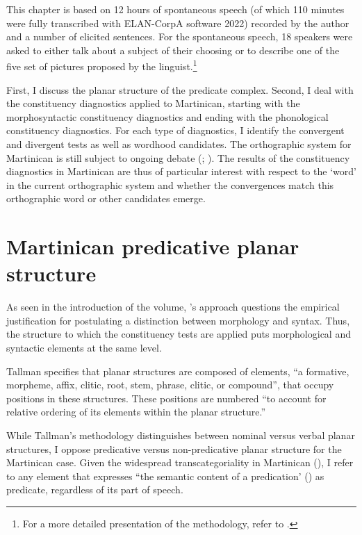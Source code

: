 \documentclass[output=paper]{langscibook}
\begin{document}
This chapter is based on 12 hours of spontaneous speech (of which 110 minutes were fully transcribed with ELAN-CorpA software 2022) recorded by the author and a number of elicited sentences. For the spontaneous speech, 18 speakers were asked to either talk about a subject of their choosing or to describe one of the five set of pictures proposed by the linguist.\footnote{For a more detailed presentation of the methodology, refer to \citealt[17--22]{Duzerol2021}.}

First, I discuss the planar structure of the predicate complex. Second, I deal with the constituency diagnostics applied to Martinican, starting with the morphosyntactic constituency diagnostics and ending with the phonological constituency diagnostics. For each type of diagnostics, I identify the convergent and divergent tests as well as wordhood candidates. The orthographic system for Martinican is still subject to ongoing debate (\citealt{Zribi-Hertz2017}; \citealt{Bernabe2013}). The results of the constituency diagnostics in Martinican are thus of particular interest with respect to the ‘word’ in the current orthographic system and whether the convergences match this orthographic word or other candidates emerge.

\section{Martinican predicative planar structure}
\label{bkm:Ref102580696}
As seen in the introduction of the volume, \citeauthor{chapters/01-Introduction}’s approach questions the empirical justification for postulating a distinction between morphology and syntax. Thus, the structure to which the constituency tests are applied puts morphological and syntactic elements at the same level.

Tallman \citep[10]{tallman2021constituency} specifies that planar structures are composed of elements, ``a formative, morpheme, affix, clitic, root, stem, phrase, clitic, or compound'', that occupy positions in these structures. These positions are numbered ``to account for relative ordering of its elements within the planar structure.''

While Tallman’s methodology distinguishes between nominal versus verbal planar structures, I oppose predicative versus non-predicative planar structure for the Martinican case. Given the widespread transcategoriality in Martinican (\citealt[75--76]{Colot2002}), I refer to any element that expresses “the semantic content of a predication' (\citealt[111]{Payne1997}) as predicate, regardless of its part of speech.
\end{document}
